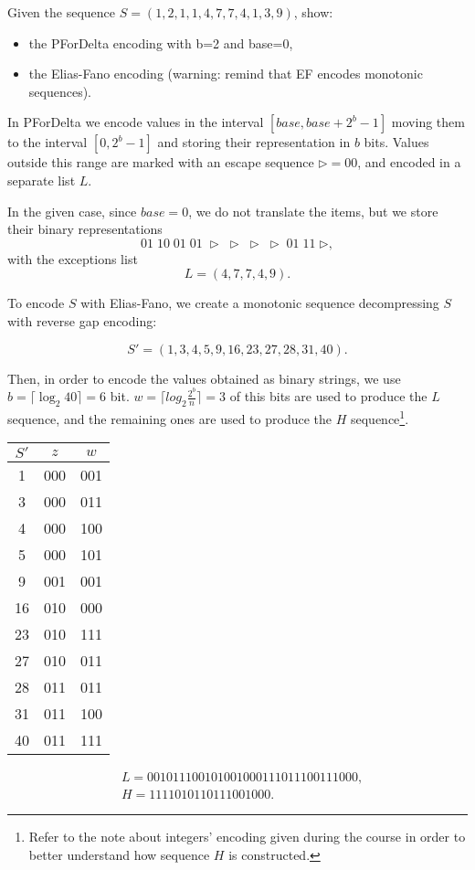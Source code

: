 \exercise

Given the sequence $S = (1, 2, 1, 1, 4, 7, 7, 4, 1, 3, 9)$, show:
%
\begin{itemize}
  \item the PForDelta encoding with b=2 and base=0,
  \item the Elias-Fano encoding (warning: remind that EF encodes monotonic
    sequences).
\end{itemize}

\solution

In PForDelta we encode values in the interval $[base,base+2^b-1]$ moving
them to the interval $[0, 2^b-1]$ and storing their representation in $b$ bits.
Values outside this range are marked with an escape sequence
$\triangleright=00$, and encoded in a separate list $L$.

In the given case, since $base=0$, we do not translate the items, but we store
their binary representations
%
$$01\;10\;01\;01\;\triangleright\;\triangleright\;\triangleright\;\triangleright\;01\;11\;\triangleright,$$
%
with the exceptions list
$$L=(4,7,7,4,9).$$

To encode $S$ with Elias-Fano, we create a monotonic sequence decompressing $S$
with reverse gap encoding:

$$S'=(1,3,4,5,9,16,23,27,28,31,40).$$

Then, in order to encode the values obtained as binary strings, we use $b = \lceil \log_2{40}\rceil = 6$ bit.
$w = \lceil log_2{\frac{2^b}{n}}\rceil = 3$ of this bits are used to produce the $L$ sequence, and the remaining ones
are used to produce the $H$ sequence\footnote{Refer to the note about integers' encoding given during the course in order
to better understand how sequence $H$ is constructed.}.

\begin{center}
  \begin{tabular}{ c | c | c }
    $S'$ & $z$ & $w$ \\ \hline
     1 & 000 & 001 \\
     3 & 000 & 011 \\
     4 & 000 & 100 \\
     5 & 000 & 101 \\
     9 & 001 & 001 \\
     16 & 010 & 000 \\
     23 & 010 & 111 \\
     27 & 010 & 011 \\
     28 & 011 & 011 \\
     31 & 011 & 100 \\
     40 & 011 & 111
  \end{tabular}
\end{center}

\begin{align*}
    &L = 001011100101001000111011100111000, \\
    &H = 1111010110111001000.
\end{align*}
